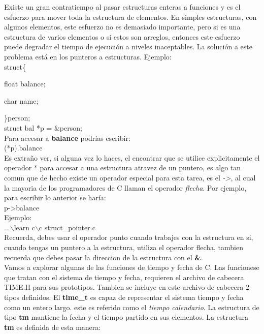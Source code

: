 \documentclass[]{article}
\begin{document}
				Existe un gran contratiempo al pasar estructuras enteras a funciones y es el esfuerzo para mover toda la estructura de elementos. En simples estructuras, con algunos elementos, este esfuerzo no es demasiado importante, pero si es una estructura de varios elementos o si estos son arreglos, entonces este esfuerzo puede degradar el tiempo de ejecución a niveles inaceptables. La solución a este problema está en los punteros a estructuras. Ejemplo:\\
				
				struct\{
				
				float balance;
				
				char name;
				
				\}person;\\
				
				struct bal *p = \&person;\\
				
				Para accesar a \textbf{balance} podrías escribir:\\
				
				(*p).balance\\
				
				Es extraño ver, si alguna vez lo haces, el encontrar que se utilice explicitamente el operador * para accesar a una estructura atravez de un puntero, es algo tan comun que de hecho existe un operador especial para esta tarea, es el \textit{->}, al cual la mayoria de los programadores de C llaman el operador \textit{flecha}. Por ejemplo, para escribir lo anterior se haría:\\
				
				p-\textgreater balance\\
				
				Ejemplo:\\
				
					...$\backslash$learn c$\backslash$c struct\_pointer.c\\
					
				Recuerda, debes usar el operador punto cuando trabajes con la estructura en si, cuando tengas un puntero a la estructura, utiliza el operador flecha, tambien recuerda que debes pasar la direccion de la estructura con el \textbf{\&}.\\
				
				Vamos a explorar algunas de las funciones de tiempo y fecha de C. Las funcionese que tratan con el sistema de tiempo y fecha, requieren el archivo de cabecera TIME.H para sus prototipos. Tambien se incluye en este archivo de cabecera 2 tipos definidos. El \textbf{time\_t} es capaz de representar el sistema tiempo y fecha como un entero largo. este es referido como el \textit{tiempo calendario}. La estructura de tipo \textbf{tm} mantiene la fecha y el tiempo partido en sus elementos. La estructura \textbf{tm} es definida de esta manera:\\
				
\end{document}
